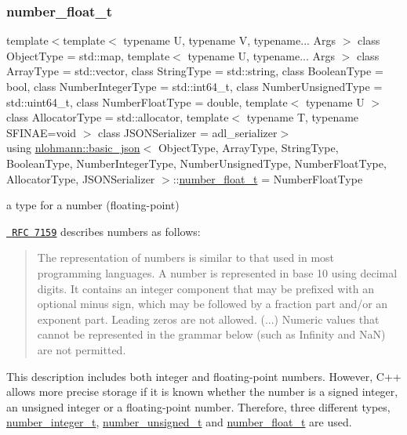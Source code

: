 \subsubsection{\texorpdfstring{number\_float\_t}{number\_float\_t}}
{\footnotesize\ttfamily template$<$template$<$ typename U, typename V, typename... Args $>$ class Object\+Type = std\+::map, template$<$ typename U, typename... Args $>$ class Array\+Type = std\+::vector, class String\+Type  = std\+::string, class Boolean\+Type  = bool, class Number\+Integer\+Type  = std\+::int64\+\_\+t, class Number\+Unsigned\+Type  = std\+::uint64\+\_\+t, class Number\+Float\+Type  = double, template$<$ typename U $>$ class Allocator\+Type = std\+::allocator, template$<$ typename T, typename S\+F\+I\+N\+A\+E=void $>$ class J\+S\+O\+N\+Serializer = adl\+\_\+serializer$>$ \\
using \mbox{\hyperlink{classnlohmann_1_1basic__json}{nlohmann\+::basic\+\_\+json}}$<$ Object\+Type, Array\+Type, String\+Type, Boolean\+Type, Number\+Integer\+Type, Number\+Unsigned\+Type, Number\+Float\+Type, Allocator\+Type, J\+S\+O\+N\+Serializer $>$\+::\mbox{\hyperlink{classnlohmann_1_1basic__json_a88d6103cb3620410b35200ee8e313d97}{number\+\_\+float\+\_\+t}} =  Number\+Float\+Type}



a type for a number (floating-\/point) 

\href{http://rfc7159.net/rfc7159}{\texttt{ R\+FC 7159}} describes numbers as follows\+: \begin{quote}
The representation of numbers is similar to that used in most programming languages. A number is represented in base 10 using decimal digits. It contains an integer component that may be prefixed with an optional minus sign, which may be followed by a fraction part and/or an exponent part. Leading zeros are not allowed. (...) Numeric values that cannot be represented in the grammar below (such as Infinity and NaN) are not permitted. \end{quote}


This description includes both integer and floating-\/point numbers. However, C++ allows more precise storage if it is known whether the number is a signed integer, an unsigned integer or a floating-\/point number. Therefore, three different types, \mbox{\hyperlink{classnlohmann_1_1basic__json_a98e611d67b7bd75307de99c9358ab2dc}{number\+\_\+integer\+\_\+t}}, \mbox{\hyperlink{classnlohmann_1_1basic__json_ab906e29b5d83ac162e823ada2156b989}{number\+\_\+unsigned\+\_\+t}} and \mbox{\hyperlink{classnlohmann_1_1basic__json_a88d6103cb3620410b35200ee8e313d97}{number\+\_\+float\+\_\+t}} are used.

